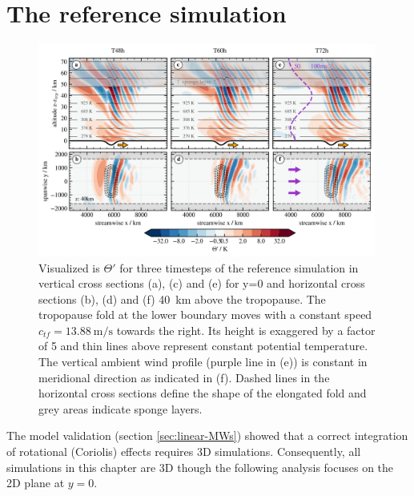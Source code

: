 \section{The reference simulation}
\label{sec:resultsq3D-reference}
\begin{figure}[t]
    \centering
    \includegraphics[width=0.99\textwidth]{figures_q3D/Q3D-th-referenceSim.png}
    \caption{Visualized is $\Theta'$ for three timesteps of the reference simulation in vertical cross sections (a), (c) and (e) for y=0 and horizontal cross sections (b), (d) and (f) \SI{40}{\kilo\meter} above the tropopause. The tropopause fold at the lower boundary moves with a constant speed $c_{tf}=\SI{13.88}{\meter\per\second}$ towards the right. Its height is exaggered by a factor of 5 and thin lines above represent constant potential temperature. The vertical ambient wind profile (purple line in (e)) is constant in meridional direction as indicated in (f). Dashed lines in the horizontal cross sections define the shape of the elongated fold and grey areas indicate sponge layers.}
    \label{fig:q3D_referenceSim}
\end{figure}
%
The model validation (section \ref{sec:linear-MWs}) showed that a correct integration of rotational (Coriolis) effects requires 3D simulations. Consequently, all simulations in this chapter are 3D though the following analysis focuses on the 2D plane at $y=0$. \\
